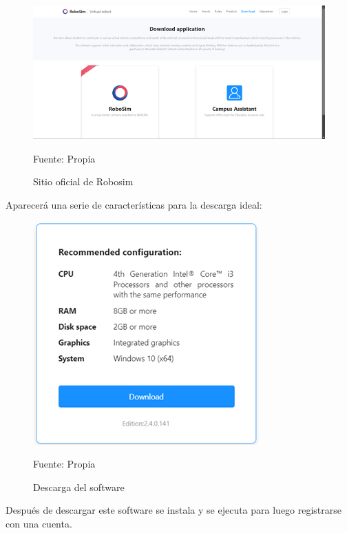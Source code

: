 \begin{figure}[H]
    \centering
    \includegraphics[scale = 0.85]{Imagenes/descarga de robosim.png}
    \caption{Sitio oficial de Robosim}{Fuente: Propia}
\end{figure}

Aparecerá una serie de características para la descarga ideal: 

\begin{figure}[H]
    \centering
    \includegraphics[scale = 0.95]{Imagenes/descarga2.png}
    \caption{Descarga del software}{Fuente: Propia}
\end{figure}

Después de descargar este software se instala y se ejecuta para luego registrarse con una cuenta.

